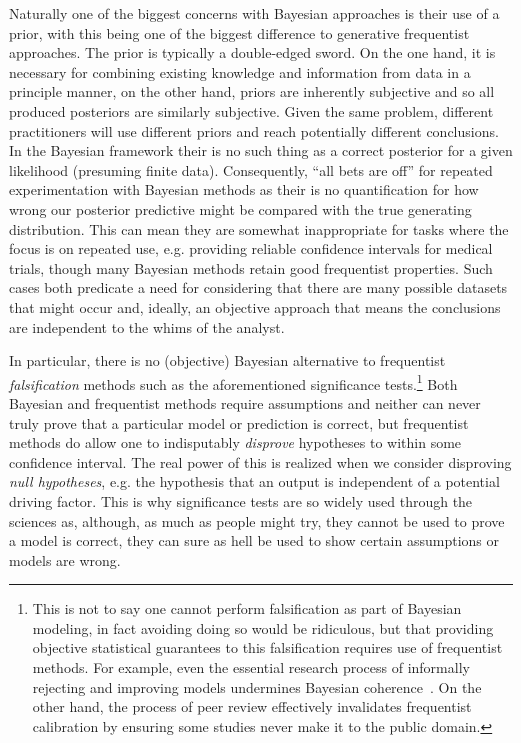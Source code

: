 Naturally one of the biggest concerns with Bayesian approaches is their use of a prior, with this being
one of the biggest difference to generative frequentist approaches.  The prior is typically a double-edged
sword.  On the one hand, it is necessary for combining existing knowledge and information from data 
in a principle manner, on the other hand, priors are inherently subjective and so all produced posteriors are
similarly subjective.  Given the same problem, different practitioners will use different priors and reach
potentially different conclusions.  In the Bayesian framework their is no such thing
as a correct posterior for a given likelihood (presuming finite data).
Consequently, ``all bets are off'' for repeated experimentation with Bayesian methods as their is no
quantification for how wrong our posterior predictive might be compared with the true generating
distribution.  This can mean they  are somewhat inappropriate for tasks where the focus is on repeated use,
e.g. providing reliable confidence intervals for medical trials, though many Bayesian methods retain
good frequentist properties.  Such cases both predicate a need for
considering that there are many possible datasets that might occur and, ideally, an objective approach
that means the conclusions are independent to the whims of the analyst.

In particular, there is no (objective) Bayesian alternative to frequentist
\emph{falsification} methods such as the aforementioned significance tests.\footnote{This is not to say one cannot 
	perform falsification as part of Bayesian modeling, in fact avoiding doing so would
	be ridiculous, but that providing objective statistical guarantees to this falsification requires use of
	frequentist methods.  For example, even the essential research process of informally
	rejecting and improving models undermines Bayesian coherence~\citep{gelman2011induction}.  On the other hand, the
	process of peer review effectively
	invalidates frequentist calibration by ensuring some studies never make it to the public domain.}
  Both Bayesian and frequentist methods require assumptions
and neither can never truly prove that a particular model or prediction is correct, but frequentist methods do
allow one to indisputably \emph{disprove} hypotheses to within some confidence interval.  The real power
of this is realized when we consider disproving \emph{null hypotheses}, e.g. the hypothesis that an
output is independent of a potential driving factor.  This is why significance tests are so widely
used through the sciences as, although, as much as people might try, they cannot be used to prove
a model is correct, they can sure as hell be used to show certain assumptions or models are wrong.

